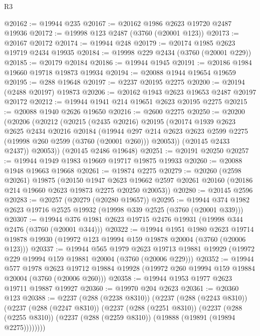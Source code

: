 \begin{lexlean}{R3}
\begin{coremodule}
@20162 := @19944 @235
@20167 := @20162 @1986 @2623 @19720 @2487 @19936
@20172 := @19998 @123 @2487 (@3760 (@20001 @123))
@20173 := @20167 @20172
@20174 := @19944 @248
@20179 := @20174 @1985 @2623 @19719 @2434 @19935
@20184 := @19998 @229 @2434 (@3760 (@20001 @229))
@20185 := @20179 @20184
@20186 := @19944 @1945
@20191 := @20186 @1984 @19660 @19718 @19873 @19934
@20194 := @20088 @1944 @19654 @19659
@20195 := @288 @19648
@20197 := @2237 @20195 @2275
@20200 := @20194 (@2488 @20197) @19873
@20206 := @20162 @1943 @2623 @19653 @2487 @20197 @20172
@20212 := @19944 @1941 @214 @19651 @2623 @20195 @2275
@20215 := @20088 @1940 @2626 @19650
@20216 := @2600 @2275
@20250 := @20200
    (@20206
      (@20212
        (@20215
          (@2435 @20216)
          @20195
          (@20174
            @1939
            @2623
            @2625
            @2434
            @20216
            @20184
            (@19944
              @297
              @214
              @2623
              @2623
              @2599
              @2275
              (@19998 @260 @2599 (@3760 (@20001 @260)))
              @20053))
          (@20145 @2433 @2437))
        @20053))
    (@20145 @2486 @19648)
@20251 := @20191 @20250
@20257 := @19944 @1949 @1983 @19669 @19717 @19875 @19933
@20260 := @20088 @1948 @19663 @19668
@20261 := @19874 @2275
@20279 := @20260
    (@2598 @20261)
    @19875
    (@20150
      @1947
      @2623
      @19662
      @2597
      @20261
      @20160
      (@20186 @214 @19660 @2623 @19873 @2275 @20250 @20053))
@20280 := @20145 @2596
@20283 := @20257 (@20279 (@20280 @19657))
@20295 := @19944 @374 @1982 @2623 @19716 @2525 @19932 (@19998 @339 @2525 (@3760 (@20001 @339)))
@20307 := @19944 @376 @1981 @2623 @19715 @2476 @19931 (@19998 @344 @2476 (@3760 (@20001 @344)))
@20322 := @19944
    @1951
    @1980
    @2623
    @19714
    @19878
    @19930
    (@19972 @123 @19994 @159 @19878 @20004 (@3760 (@20006 @123)))
@20337 := @19944
    @565
    @1979
    @2623
    @19713
    @19881
    @19929
    (@19972 @229 @19994 @159 @19881 @20004 (@3760 (@20006 @229)))
@20352 := @19944
    @577
    @1978
    @2623
    @19712
    @19884
    @19928
    (@19972 @260 @19994 @159 @19884 @20004 (@3760 (@20006 @260)))
@20358 := @19944 @1953 @1977 @2623 @19711 @19887 @19927
@20360 := @19970 @204 @2623
@20361 := @20360 @123
@20388 := @2237
    (@288 (@2238 @8310))
    (@2237
      (@288 (@2243 @8310))
      (@2237
        (@288 (@2247 @8310))
        (@2237
          (@288 (@2251 @8310))
          (@2237
            (@288 (@2255 @8310))
            (@2237 (@288 (@2259 @8310)) (@19888 (@19891 (@19894 @2275))))))))

\end{coremodule}
\end{lexlean}
